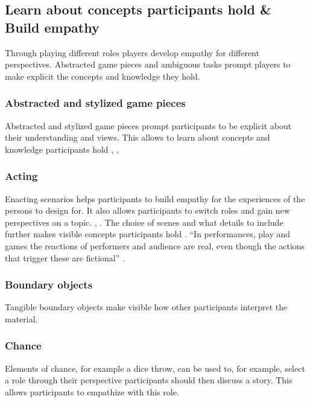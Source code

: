 \documentclass[draft,twoside]{vutinfth}
\begin{document}
        \subsection{Learn about concepts participants hold \& Build empathy}
        Through playing different roles players develop empathy for different perspectives. Abstracted game pieces and ambiguous tasks 
        prompt players to make explicit the concepts and knowledge they hold. 

            \subsubsection{Abstracted and stylized game pieces}
            Abstracted and stylized game pieces prompt participants to be explicit about their understanding and views. This allows 
            to learn about concepts and knowledge participants hold \cite{brandtDesigningExploratoryDesign2006}, \cite{vaajakallioDesignGamesCodesign2014}, 
            \cite{kjaersgaardDesignGamesFieldwork2021}

            \subsubsection{Acting}
            Enacting scenarios helps participants to build empathy for the experiences of the persons to design for. It also allows participants to 
            switch roles and gain new perspectives on a topic. \cite{brandtFacilitatingCollaborationDesign2004a}, \cite{vaajakallioDesignGamesCodesign2014}. 
            The choice of scenes and what details to include further makes visible concepts participants hold \cite{kjaersgaardDesignGamesFieldwork2021}. 
            ``In performances, play and games the reactions of performers and audience are real, even though the actions that trigger these are fictional'' 
            \cite{vaajakallioDesignGamesCodesign2014}. 

            \subsubsection{Boundary objects}
            Tangible boundary objects make visible how other participants interpret the material. \cite{brandtFacilitatingCollaborationDesign2004a}

            \subsubsection{Chance}
            Elements of chance, for example a dice throw, can be used to, for example, select a role through their perspective participants 
            should then discuss a story. This allows participants to empathize with this role. \cite{kjaersgaardDesignGamesFieldwork2021}
\end{document}
